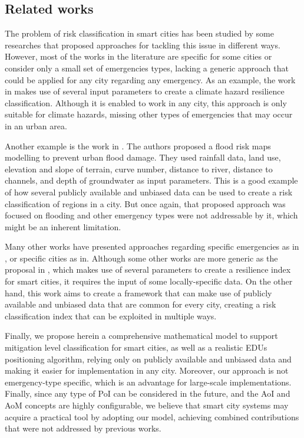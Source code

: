 \begin{refsection}
\section{Related works}\label{sec:works}

The problem of risk classification in smart cities has been studied by some researches that proposed approaches for tackling this issue in different ways. However, most of the works in the literature are specific for some cities or consider only a small set of emergencies types, lacking a generic approach that could be applied for any city regarding any emergency. As an example, the work in \cite{Hung_2016} makes use of several input parameters to create a climate hazard resilience classification. Although it is enabled to work in any city, this approach is only suitable for climate hazards, missing other types of emergencies that may occur in an urban area.

Another example is the work in \cite{Darabi_2019}. The authors proposed a flood risk maps modelling to prevent urban flood damage. They used rainfall data, land use, elevation and slope of terrain, curve number, distance to river, distance to channels, and depth of groundwater as input parameters. This is a good example of how several publicly available and unbiased data can be used to create a risk classification of regions in a city. But once again, that proposed approach was focused on flooding and other emergency types were not addressable by it, which might be an inherent limitation.

Many other works have presented approaches regarding specific emergencies as in \cite{Hondula_2015,Maio_2018}, or specific cities as in\cite{Fernandez_2015}. Although some other works are more generic as the proposal in \cite{Kontokosta_2018}, which makes use of several parameters to create a resilience index for smart cities, it requires the input of some locally-specific data. On the other hand, this work aims to create a framework that can make use of publicly available and unbiased data that are common for every city, creating a risk classification index that can be exploited in multiple ways.

Finally, we propose herein a comprehensive mathematical model to support mitigation level classification for smart cities, as well as a realistic EDUs positioning algorithm, relying only on publicly available and unbiased data and making it easier for implementation in any city. Moreover, our approach is not emergency-type specific, which is an advantage for large-scale implementations. Finally, since any type of PoI can be considered in the future, and the AoI and AoM concepts are highly configurable, we believe that smart city systems may acquire a practical tool by adopting our model, achieving combined contributions that were not addressed by previous works. 


\end{refsection}
